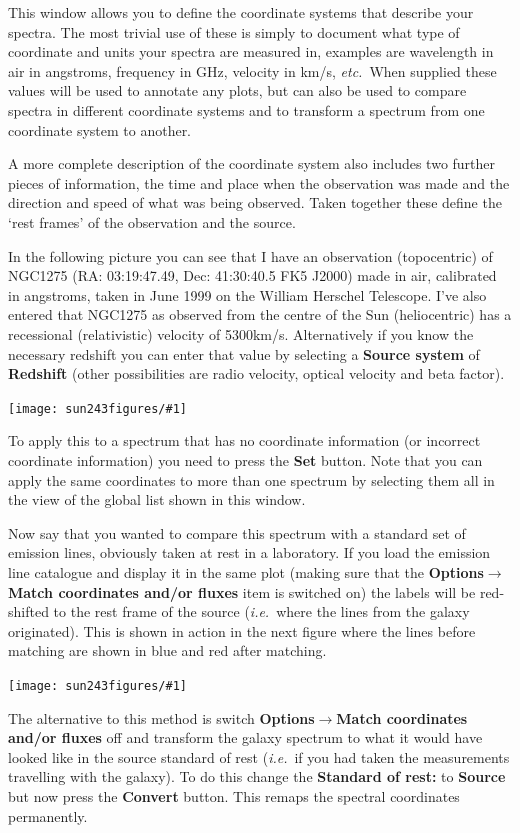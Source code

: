 \documentclass[twoside,11pt]{article}
\newcommand{\htmladdimg}[1]{}
\newcommand{\latexhtml}[2]{#1}
\renewcommand{\_}{\texttt{\symbol{95}}}
\newcommand{\mainfigure}[1]
{\begin{center}
 \latexhtml{\texttt{[image: sun243\_figures/\#1]}}{\htmladdimg{#1.gif}}
 \end{center}
}
\newcommand{\submenuitem}[2]{\latexhtml{\textbf{#1$\rightarrow$#2}}{\textbf{#1->#2}}}
\newcommand{\labelitem}[1]{\textbf{#1}}
\newcommand{\ie}{\textit{i.e.}}
\newcommand{\etc}{\textit{etc.}}
\begin{document}
This window allows you to define the coordinate systems that describe your
spectra. The most trivial use of these is simply to document what type of
coordinate and units your spectra are measured in, examples are wavelength in
air in angstroms, frequency in GHz, velocity in km/s, \etc\ When supplied
these values will be used to annotate any plots, but can also be used to
compare spectra in different coordinate systems and to transform a spectrum
from one coordinate system to another.

A more complete description of the coordinate system also includes two further
pieces of information, the time and place when the observation was made and
the direction and speed of what was being observed. Taken together these
define the `rest frames' of the observation and the source.

In the following picture you can see that I have an observation (topocentric)
of NGC1275 (RA: 03:19:47.49, Dec: 41:30:40.5 FK5 J2000) made in air,
calibrated in angstroms, taken in June 1999 on the William Herschel
Telescope. I've also entered that NGC1275 as observed from the centre of the
Sun (heliocentric) has a recessional (relativistic) velocity of 5300km/s.
Alternatively if you know the necessary redshift you can enter that value
by selecting a \labelitem{Source system} of \labelitem{Redshift} (other
possibilities are radio velocity, optical velocity and beta factor).

\mainfigure{coordinatesystemwindow}

To apply this to a spectrum that has no coordinate information (or incorrect
coordinate information) you need to press the \labelitem{Set} button. Note
that you can apply the same coordinates to more than one spectrum by selecting
them all in the view of the global list shown in this window.

Now say that you wanted to compare this spectrum with a standard set of
emission lines, obviously taken at rest in a laboratory. If you load the
emission line catalogue and display it in the same plot (making sure that the
\submenuitem{Options}{Match coordinates and/or fluxes} item is switched on)
the labels will be red-shifted to the rest frame of the source (\ie\ where the
lines from the galaxy originated). This is shown in action in the next figure
where the lines before matching are shown in blue and red after matching.

\mainfigure{coordinatesystemplot}

The alternative to this method is switch
\submenuitem{Options}{Match coordinates and/or fluxes} off and transform the
galaxy spectrum to what it would have looked like in the source standard of
rest (\ie\ if you had taken the measurements travelling with the galaxy). To
do this change the \labelitem{Standard of rest:} to \labelitem{Source} but now
press the \labelitem{Convert} button. This remaps the spectral coordinates
permanently.
\end{document}
